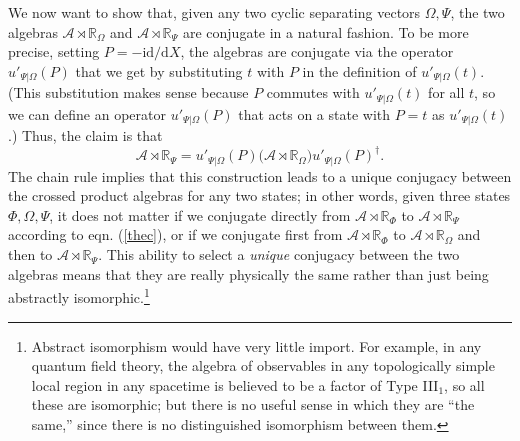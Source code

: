 \documentclass[11pt,a4paper]{article}
\def\i{{\mathrm i}}
\def\be{\begin{equation}}
\def\ee{\end{equation}}
\def\A{{\mathcal A}}
\def\d{{\mathrm d}}
\def\R{{\mathbb R}}
\begin{document}
We now want to show that, given any two cyclic separating vectors $\Omega,\Psi$, the two algebras $\A\rtimes\R_\Omega$ and $\A\rtimes\R_\Psi$
are conjugate in a natural fashion.  To be more precise, setting $P=-\i \d/\d X$, the algebras are conjugate via the operator $u'_{\Psi|\Omega}(P)$ that we get by substituting $t$ with $P$ in the definition of
$u'_{\Psi|\Omega}(t)$.   (This substitution makes sense because $P$ commutes with $u'_{\Psi|\Omega}(t)$ for all $t$, so we can define an operator 
$u'_{\Psi|\Omega}(P)$ that acts on a state with $P=t$ as $u'_{\Psi|\Omega}(t)$.)   Thus, the claim is that
\be\label{thec} \A\rtimes\R_\Psi =u'_{\Psi|\Omega}(P) \bigl(\A\rtimes \R_\Omega\bigr) u'_{\Psi|\Omega}(P)^\dagger.\ee
The chain rule implies that this construction leads to a unique conjugacy between the crossed product algebras for any two states; in other words,
given three states $\Phi,\Omega,\Psi$, it does not matter if we conjugate directly from  $\A\rtimes\R_\Phi$  to
$ \A\rtimes\R_\Psi$ according to eqn. (\ref{thec}), or if we conjugate first from $\A\rtimes\R_\Phi$ to  $\A\rtimes\R_\Omega$ and then to $ \A\rtimes\R_\Psi$.  This ability  to select a {\it unique}
conjugacy between the two algebras means that they are really physically the same rather than just being abstractly isomorphic.\footnote{Abstract isomorphism
would have very little import.  For example,  in any quantum field theory, the algebra of observables 
in  any topologically simple local region in any spacetime is believed to be a factor of Type III$_1$,
so all these are isomorphic; but there is no useful sense in which they are ``the same,'' since there is no distinguished isomorphism between them.}
\end{document}
